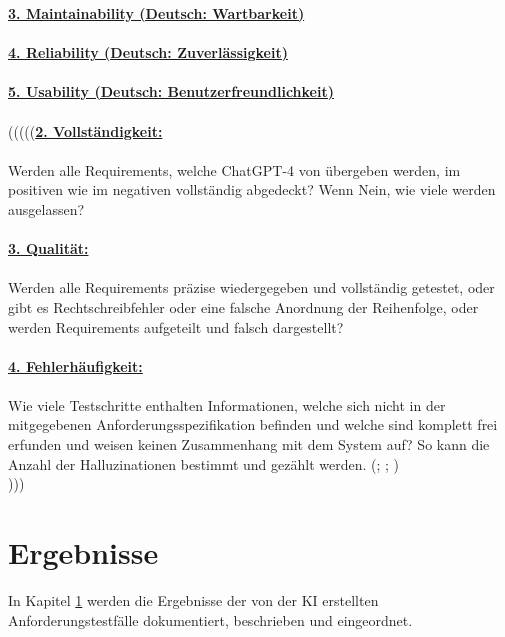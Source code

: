 \documentclass[12pt,toc=bib,toc=listof]{scrreprt}
\begin{document}
\textbf{\underline{3. Maintainability (Deutsch: Wartbarkeit)}}\\
\\
\textbf{\underline{4. Reliability (Deutsch: Zuverlässigkeit)}}\\
\\
\textbf{\underline{5. Usability (Deutsch: Benutzerfreundlichkeit)}}\\
\\
(((((\textbf{\underline{2. Vollständigkeit:}}\\
\\
Werden alle Requirements, welche ChatGPT-4 von \textcite{OpenAI2025} übergeben werden, im positiven wie im negativen vollständig abgedeckt? Wenn Nein, wie viele werden ausgelassen?\\
\\
\textbf{\underline{3. Qualität:}}\\
\\
Werden alle Requirements präzise wiedergegeben und vollständig getestet, oder gibt es Rechtschreibfehler oder eine falsche Anordnung der Reihenfolge, oder werden Requirements aufgeteilt und falsch dargestellt?\\
\\
\textbf{\underline{4. Fehlerhäufigkeit:}}\\
\\
Wie viele Testschritte enthalten Informationen, welche sich nicht in der mitgegebenen Anforderungsspezifikation befinden und welche sind komplett frei erfunden und weisen keinen Zusammenhang mit dem System auf? So kann die Anzahl der Halluzinationen bestimmt und gezählt werden. (\cite{Aysolmaz2018}; \cite{Barmi2011}; \cite{Mustafa2021})\\
)))

\chapter{Ergebnisse} %
\label{sec:ergebnisse}
In Kapitel \ref{sec:ergebnisse} werden die Ergebnisse der von der KI erstellten Anforderungstestfälle dokumentiert, beschrieben und eingeordnet.
\end{document}
